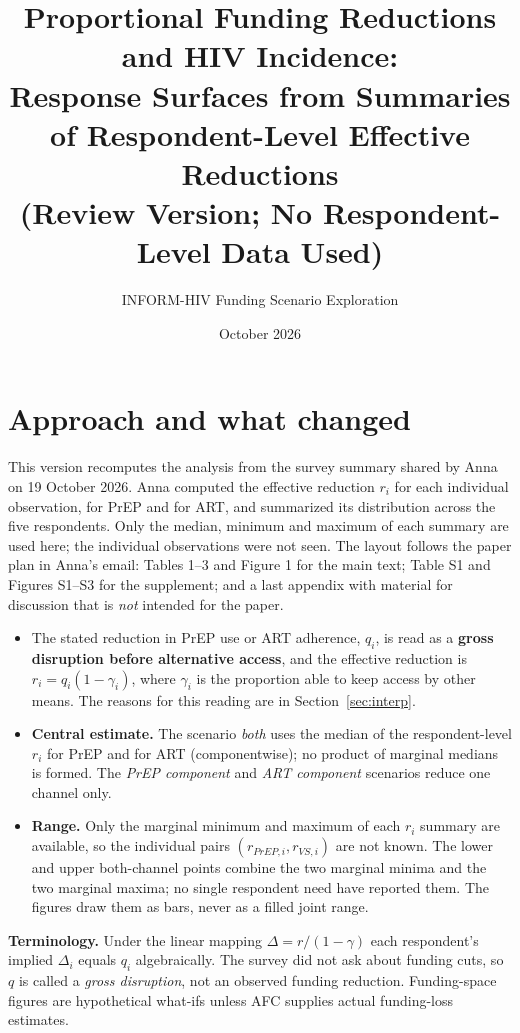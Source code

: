 \documentclass[10pt,a4paper]{article}
\title{Proportional Funding Reductions and HIV Incidence:\\Response Surfaces from Summaries of Respondent-Level Effective Reductions\\(Review Version; No Respondent-Level Data Used)}
\author{INFORM-HIV Funding Scenario Exploration}
\date{October 2026}
\begin{document}
\maketitle
\DataBanner

\section{Approach and what changed}
This version recomputes the analysis from the survey summary shared by Anna on 19 October 2026. Anna computed the effective reduction $r_i$ for each individual observation, for PrEP and for ART, and summarized its distribution across the five respondents. Only the median, minimum and maximum of each summary are used here; the individual observations were not seen. The layout follows the paper plan in Anna's email: Tables 1--3 and Figure 1 for the main text; Table S1 and Figures S1--S3 for the supplement; and a last appendix with material for discussion that is \emph{not} intended for the paper.
\begin{itemize}[nosep]
\item The stated reduction in PrEP use or ART adherence, $q_i$, is read as a \textbf{gross disruption before alternative access}, and the effective reduction is $r_i=q_i(1-\gamma_i)$, where $\gamma_i$ is the proportion able to keep access by other means. The reasons for this reading are in Section~\ref{sec:interp}.
\item \textbf{Central estimate.} The scenario \emph{both} uses the median of the respondent-level $r_i$ for PrEP and for ART (componentwise); no product of marginal medians is formed. The \emph{PrEP component} and \emph{ART component} scenarios reduce one channel only.
\item \textbf{Range.} Only the marginal minimum and maximum of each $r_i$ summary are available, so the individual pairs $(r_{PrEP,i},r_{VS,i})$ are not known. The lower and upper both-channel points combine the two marginal minima and the two marginal maxima; no single respondent need have reported them. The figures draw them as bars, never as a filled joint range.
\end{itemize}
\textbf{Terminology.} Under the linear mapping $\Delta=r/(1-\gamma)$ each respondent's implied $\Delta_i$ equals $q_i$ algebraically. The survey did not ask about funding cuts, so $q$ is called a \emph{gross disruption}, not an observed funding reduction. Funding-space figures are hypothetical what-ifs unless AFC supplies actual funding-loss estimates.
\end{document}

